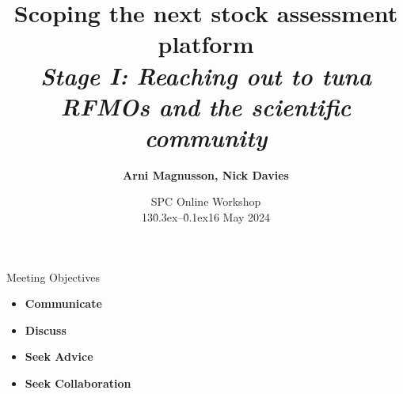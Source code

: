 \documentclass[aspectratio=169,fleqn]{beamer}
\begin{document}
\begin{frame}
  \title{\vspace{-5ex}\darkblue Scoping the next stock assessment
    platform\\[2ex]
    \it\large\darkgray
    Stage I: Reaching out to tuna RFMOs and the scientific community}
  \author{\vspace{-10ex}\darkgray\bf
    Arni Magnusson, Nick Davies}
  \date{\darkgreen SPC Online Workshop\\[0.5ex]
    13\h{0.3ex}--\h{0.1ex}16 May 2024}
  \titlepage
\end{frame}


\begin{frame}{Meeting Objectives}
  \begin{itemize}
    \item[] {\bf\darkblue Communicate} \\[5ex]
    \item[] {\bf\darkblue Discuss} \\[5ex]
    \item[] {\bf\darkblue Seek Advice} \\[5ex]
    \item[] {\bf\darkblue Seek Collaboration} \\[1ex]
  \end{itemize}
\end{frame}

\end{document}
